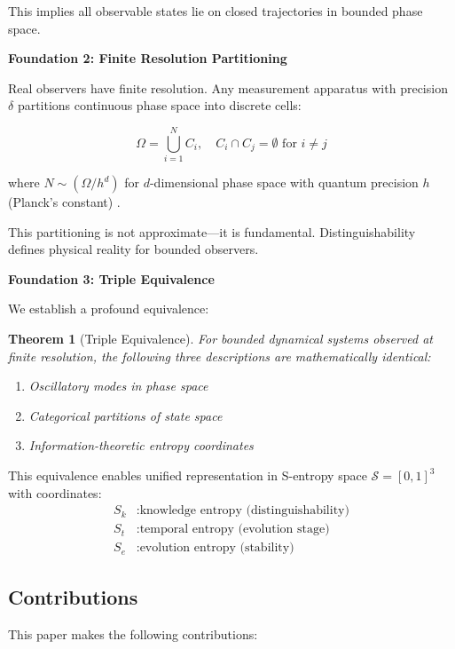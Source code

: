 \documentclass[twocolumn,10pt]{article}
\newtheorem{theorem}{Theorem}
\begin{document}
This implies all observable states lie on closed trajectories in bounded phase space.

\textbf{Foundation 2: Finite Resolution Partitioning}

Real observers have finite resolution. Any measurement apparatus with precision $\delta$ partitions continuous phase space into discrete cells:

\begin{equation}
\Omega = \bigcup_{i=1}^{N} C_i, \quad C_i \cap C_j = \emptyset \text{ for } i \neq j
\end{equation}

where $N \sim (\Omega/h^d)$ for $d$-dimensional phase space with quantum precision $h$ (Planck's constant) \cite{Landau1980}.

This partitioning is not approximate—it is fundamental. Distinguishability defines physical reality for bounded observers.

\textbf{Foundation 3: Triple Equivalence}

We establish a profound equivalence:

\begin{theorem}[Triple Equivalence]
\label{thm:triple_equiv}
For bounded dynamical systems observed at finite resolution, the following three descriptions are mathematically identical:
\begin{enumerate}
\item Oscillatory modes in phase space
\item Categorical partitions of state space
\item Information-theoretic entropy coordinates
\end{enumerate}
\end{theorem}

This equivalence enables unified representation in S-entropy space $\mathcal{S} = [0,1]^3$ with coordinates:
\begin{align}
S_k &: \text{knowledge entropy (distinguishability)} \\
S_t &: \text{temporal entropy (evolution stage)} \\
S_e &: \text{evolution entropy (stability)}
\end{align}

\subsection{Contributions}

This paper makes the following contributions:
\end{document}
